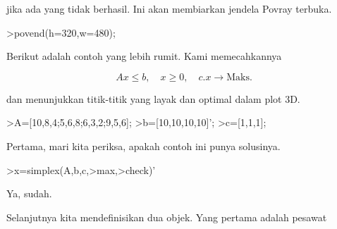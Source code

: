 \documentclass[a4paper,10pt]{article}
\begin{document}
\begin{eulernotebook}
\begin{eulercomment}
\begin{eulercomment}
\begin{eulercomment}
jika ada yang tidak berhasil. Ini akan membiarkan jendela Povray
terbuka.
\end{eulercomment}
\begin{eulerprompt}
>povend(h=320,w=480);
\end{eulerprompt}
\begin{eulercomment}
Berikut adalah contoh yang lebih rumit. Kami memecahkannya

\end{eulercomment}
\begin{eulerformula}
\[
Ax \le b, \quad x \ge 0, \quad c.x \to \text{Maks.}
\]
\end{eulerformula}
\begin{eulercomment}
dan menunjukkan titik-titik yang layak dan optimal dalam plot 3D.
\end{eulercomment}
\begin{eulerprompt}
>A=[10,8,4;5,6,8;6,3,2;9,5,6];
>b=[10,10,10,10]';
>c=[1,1,1];
\end{eulerprompt}
\begin{eulercomment}
Pertama, mari kita periksa, apakah contoh ini punya solusinya.
\end{eulercomment}
\begin{eulerprompt}
>x=simplex(A,b,c,>max,>check)'
\end{eulerprompt}
\begin{euleroutput}
  [0,  1,  0.5]
\end{euleroutput}
\begin{eulercomment}
Ya, sudah.

Selanjutnya kita mendefinisikan dua objek. Yang pertama adalah pesawat


\end{eulercomment}
\end{eulercomment}
\end{eulercomment}
\end{eulernotebook}
\end{document}
